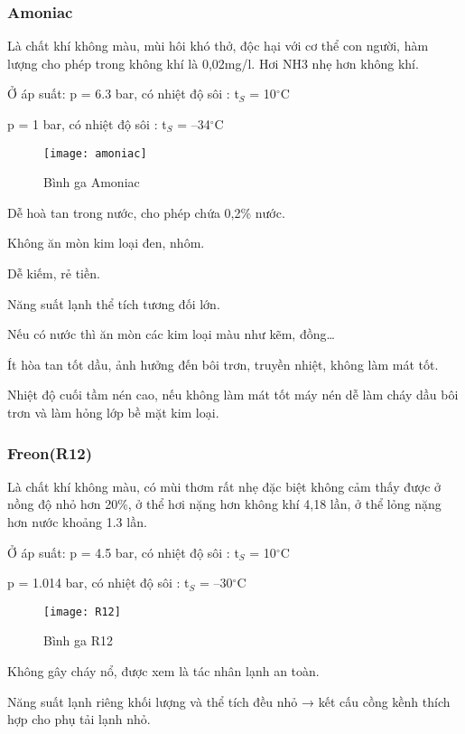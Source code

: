\begin{table}[H]
\subsubsection{Amoniac}
Là chất khí không màu, mùi hôi khó thở, độc hại với cơ thể con người, hàm lượng cho phép trong không khí là 0,02mg/l. Hơi NH3 nhẹ hơn không khí.

Ở áp suất: 
\hspace{1cm}
p = 6.3 bar, có nhiệt độ sôi : t$_{S}$ = 10$^{\circ}$C

\hspace{2.95cm}
p = 1 bar, có nhiệt độ sôi : t$_{S}$ = –34$^{\circ}$C
\begin{figure}[H]
	\centering
	\texttt{[image: amoniac]}
	\caption{Bình ga Amoniac}
\end{figure}

Dễ hoà tan trong nước, cho phép chứa 0,2\% nước.

Không ăn mòn kim loại đen, nhôm.

Dễ kiếm, rẻ tiền.

Năng suất lạnh thể tích tương đối lớn.

Nếu có nước thì ăn mòn các kim loại màu như kẽm, đồng…

Ít hòa tan tốt dầu, ảnh hưởng đến bôi trơn, truyền nhiệt, không làm mát tốt.

Nhiệt độ cuối tầm nén cao, nếu không làm mát tốt máy nén dễ làm cháy dầu bôi trơn và làm hỏng lớp bề mặt kim loại.
\subsubsection{Freon(R12)}
Là chất khí không màu, có mùi thơm rất nhẹ đặc biệt không cảm thấy được ở nồng độ nhỏ hơn 20\%, ở thể hơi nặng hơn không khí 4,18 lần, ở thể lỏng nặng hơn nước khoảng 1.3 lần.

Ở áp suất: 
\hspace{1cm}
p = 4.5 bar, có nhiệt độ sôi : t$_{S}$ = 10$^{\circ}$C

\hspace{2.95cm}
p = 1.014 bar, có nhiệt độ sôi : t$_{S}$ = –30$^{\circ}$C
\begin{figure}[H]
	\centering
	\texttt{[image: R12]}
	\caption{Bình ga R12}
\end{figure}

Không gây cháy nổ, được xem là tác nhân lạnh an toàn.

Năng suất lạnh riêng khối lượng và thể tích đều nhỏ → kết cấu cồng kềnh thích hợp cho phụ tải lạnh nhỏ.


\end{table}
